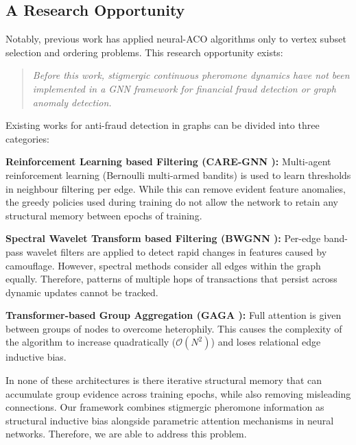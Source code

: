 \subsection{A Research Opportunity}
\label{sec:research_opportunity}
Notably, previous work has applied neural-ACO algorithms only to vertex subset selection and ordering problems. This research opportunity exists:

\begin{quote}\small\raggedright
    \textit{Before this work, stigmergic continuous pheromone dynamics have not been implemented in a GNN framework for financial fraud detection or graph anomaly detection.}
\end{quote}

Existing works for anti-fraud detection in graphs can be divided into three categories:

\textbf{Reinforcement Learning based Filtering (CARE-GNN \cite{dou2020enhancing}):} Multi-agent reinforcement learning (Bernoulli multi-armed bandits) is used to learn thresholds in neighbour filtering per edge. While this can remove evident feature anomalies, the greedy policies used during training do not allow the network to retain any structural memory between epochs of training.

\textbf{Spectral Wavelet Transform based Filtering (BWGNN \cite{tang2021rethinking}):} Per-edge band-pass wavelet filters are applied to detect rapid changes in features caused by camouflage. However, spectral methods consider all edges within the graph equally. Therefore, patterns of multiple hops of transactions that persist across dynamic updates cannot be tracked.

\textbf{Transformer-based Group Aggregation (GAGA \cite{wang2023gaga}):} Full attention is given between groups of nodes to overcome heterophily. This causes the complexity of the algorithm to increase quadratically ($\mathcal{O}(N^2)$) and loses relational edge inductive bias.

In none of these architectures is there iterative structural memory that can accumulate group evidence across training epochs, while also removing misleading connections. Our framework combines stigmergic pheromone information as structural inductive bias alongside parametric attention mechanisms in neural networks. Therefore, we are able to address this problem.

